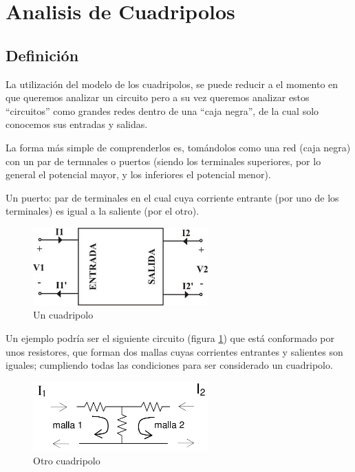 \documentclass[../main.tex]{subfiles}
\begin{document}
\graphicspath{{../imagenes/cuadripolos/malle/}}
{\newcommand{\subsubsectionbreak}{\clearpage}

\section{Analisis de Cuadripolos}
	\subsection{Definición}
	La utilización del modelo de los cuadripolos, se puede reducir a el momento en que 
	queremos analizar un circuito pero a su vez queremos analizar estos ``circuitos'' 
	como grandes redes dentro de una ``caja negra'', de la cual solo conocemos sus 
	entradas y salidas.

	La forma más simple de comprenderlos es, tomándolos como una red (caja negra) 
	con un par de termnales o puertos (siendo los terminales superiores, por lo 
	general el potencial mayor, y los inferiores el potencial menor).

	Un puerto: par de terminales en el cual cuya corriente entrante 
	(por uno de los terminales) es igual a la saliente (por el otro).
	\begin{figure}[H]
		\centering
		\includegraphics[width=0.6\textwidth]{imagen1.png}
		\caption{Un cuadripolo}
	\end{figure}

	Un ejemplo podría ser el siguiente circuito (figura \ref{cuadripolo_2}) 
	que está conformado por unos resistores, que forman dos mallas cuyas 
	corrientes entrantes y salientes son iguales; cumpliendo 
	todas las condiciones para ser considerado un cuadripolo.
	\begin{figure}[H]
		\centering
		\includegraphics[width=0.6\textwidth]{imagen2.png}
		\caption{Otro cuadripolo}
		\label{cuadripolo_2}
	\end{figure}

}
\end{document}
